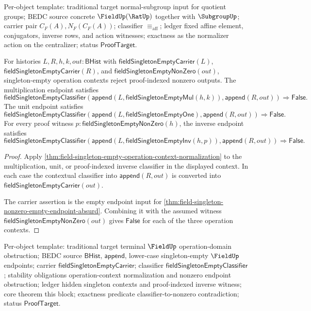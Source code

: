 Per-object template: traditional target normal-subgroup input for quotient
groups; BEDC source concrete $\FieldUp(\RatUp)$ together with $\SubgroupUp$;
carrier pair $C_F(A),N_F(C_F(A))$; classifier $\equiv_{\mathrm{aff}}$; ledger
fixed affine element, conjugators, inverse rows, and action witnesses; exactness
as the normalizer action on the centralizer; status $\mathsf{ProofTarget}$.

\begin{theorem}
\label{thm:field-singleton-empty-operation-context-nonzero-obstruction}
For histories $L,R,h,k,out:\mathsf{BHist}$ with
$\mathsf{fieldSingletonEmptyCarrier}(L)$,
$\mathsf{fieldSingletonEmptyCarrier}(R)$, and
$\mathsf{fieldSingletonEmptyNonZero}(out)$, singleton-empty operation contexts
reject proof-indexed nonzero outputs. The multiplication endpoint satisfies
$$
\mathsf{fieldSingletonEmptyClassifier}
  (\mathsf{append}(L,\mathsf{fieldSingletonEmptyMul}(h,k)),
   \mathsf{append}(R,out))
\Longrightarrow
\mathsf{False}.
$$
The unit endpoint satisfies
$$
\mathsf{fieldSingletonEmptyClassifier}
  (\mathsf{append}(L,\mathsf{fieldSingletonEmptyOne}),
   \mathsf{append}(R,out))
\Longrightarrow
\mathsf{False}.
$$
For every proof witness
$p:\mathsf{fieldSingletonEmptyNonZero}(h)$, the inverse endpoint satisfies
$$
\mathsf{fieldSingletonEmptyClassifier}
  (\mathsf{append}(L,\mathsf{fieldSingletonEmptyInv}(h,p)),
   \mathsf{append}(R,out))
\Longrightarrow
\mathsf{False}.
$$
\end{theorem}
\begin{proof}
Apply \autoref{thm:field-singleton-empty-operation-context-normalization} to
the multiplication, unit, or proof-indexed inverse classifier in the displayed
context. In each case the contextual classifier into $\mathsf{append}(R,out)$
is converted into $\mathsf{fieldSingletonEmptyCarrier}(out)$.

The carrier assertion is the empty endpoint input for
\autoref{thm:field-singleton-nonzero-empty-endpoint-absurd}. Combining it with
the assumed witness $\mathsf{fieldSingletonEmptyNonZero}(out)$ gives
$\mathsf{False}$ for each of the three operation contexts.
\end{proof}

Per-object template: traditional target terminal $\FieldUp$ operation-domain
obstruction; BEDC source $\mathsf{BHist}$, $\mathsf{append}$, lower-case
singleton-empty $\FieldUp$ endpoints; carrier
$\mathsf{fieldSingletonEmptyCarrier}$; classifier
$\mathsf{fieldSingletonEmptyClassifier}$; stability obligations
operation-context normalization and nonzero endpoint obstruction; ledger hidden
singleton contexts and proof-indexed inverse witness; core theorem this block;
exactness predicate classifier-to-nonzero contradiction; status
$\mathsf{ProofTarget}$.

